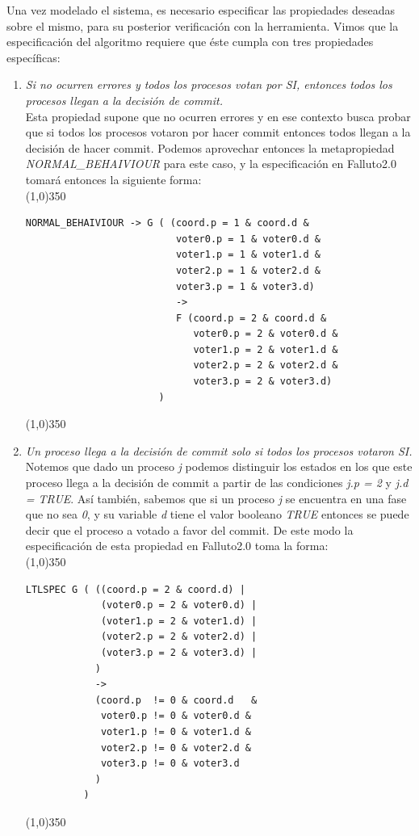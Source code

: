 \documentclass[pdftex,a4paper,12pt]{book}
\begin{document}
Una vez modelado el sistema, es necesario especificar las propiedades deseadas sobre el mismo, para su posterior verificaci\'on con la herramienta. Vimos que la especificaci\'on del algoritmo requiere que \'este cumpla con tres propiedades espec\'ificas:
\begin{enumerate}
\item \textit{Si no ocurren errores y todos los procesos votan por SI, entonces todos los procesos llegan a la decisi\'on de commit.}\\ Esta propiedad supone que no ocurren errores y en ese contexto busca probar que si todos los procesos votaron por hacer commit entonces todos llegan a la decisi\'on de hacer commit. Podemos aprovechar entonces la metapropiedad \textit{NORMAL\_BEHAIVIOUR} para este caso, y la especificaci\'on en Falluto2.0 tomar\'a entonces la siguiente forma:\\

\noindent \line(1,0){350}
\begin{verbatim}
NORMAL_BEHAIVIOUR -> G ( (coord.p = 1 & coord.d & 
                          voter0.p = 1 & voter0.d & 
                          voter1.p = 1 & voter1.d & 
                          voter2.p = 1 & voter2.d & 
                          voter3.p = 1 & voter3.d) 
                          -> 
                          F (coord.p = 2 & coord.d & 
                             voter0.p = 2 & voter0.d & 
                             voter1.p = 2 & voter1.d & 
                             voter2.p = 2 & voter2.d & 
                             voter3.p = 2 & voter3.d)
                       )
\end{verbatim}
\noindent \line(1,0){350}
~\\

\item \textit{Un proceso llega a la decisi\'on de commit solo si todos los procesos votaron SI.}\\ Notemos que dado un proceso \textit{j} podemos distinguir los estados en los que este proceso llega a la decisi\'on de commit a partir de las condiciones \textit{j.p = 2} y \textit{j.d = TRUE}. As\'i tambi\'en, sabemos que si un proceso \textit{j} se encuentra en una fase que no sea \textit{0}, y su variable \textit{d} tiene el valor booleano \textit{TRUE} entonces se puede decir que el proceso a votado a favor del commit. De este modo la especificaci\'on de esta propiedad en Falluto2.0 toma la forma:\\
\noindent \line(1,0){350}
\begin{verbatim}
LTLSPEC G ( ((coord.p = 2 & coord.d) |
             (voter0.p = 2 & voter0.d) |            
             (voter1.p = 2 & voter1.d) |
             (voter2.p = 2 & voter2.d) |
             (voter3.p = 2 & voter3.d) |
            )
            -> 
            (coord.p  != 0 & coord.d   &
             voter0.p != 0 & voter0.d & 
             voter1.p != 0 & voter1.d & 
             voter2.p != 0 & voter2.d & 
             voter3.p != 0 & voter3.d
            )
          ) 
\end{verbatim}
\noindent \line(1,0){350}



\end{enumerate}
\end{document}
